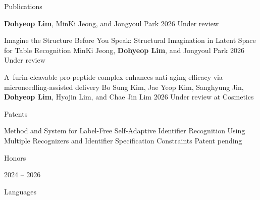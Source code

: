 \documentclass[11pt,a4paper]{article}
\begin{document}
\begin{cvsection}{Publications}

  {\textbf{Dohyeop Lim}, MinKi Jeong, and Jongyoul Park}
  {2026}
  {Under review}

\publicationentry
  {Imagine the Structure Before You Speak: Structural Imagination in Latent Space for Table Recognition}
  {MinKi Jeong, \textbf{Dohyeop Lim}, and Jongyoul Park}
  {2026}
  {Under review}

\publicationentry
  {A~furin-cleavable pro-peptide complex enhances anti-aging efficacy via microneedling-assisted delivery}
  {Bo Sung Kim, Jae Yeop Kim, Sanghyung Jin, \textbf{Dohyeop Lim}, Hyojin Lim, and Chae Jin Lim}
  {2026}
  {Under review at Cosmetics}

\end{cvsection}

\begin{cvsection}{Patents}

  {Method and System for Label-Free Self-Adaptive Identifier Recognition Using Multiple Recognizers and Identifier Specification Constraints}
  {Patent pending}

\end{cvsection}

\begin{cvsection}{Honors}

  {2024 -- 2026}

\end{cvsection}

\begin{cvsection}{Languages}


\end{cvsection}
\end{document}
